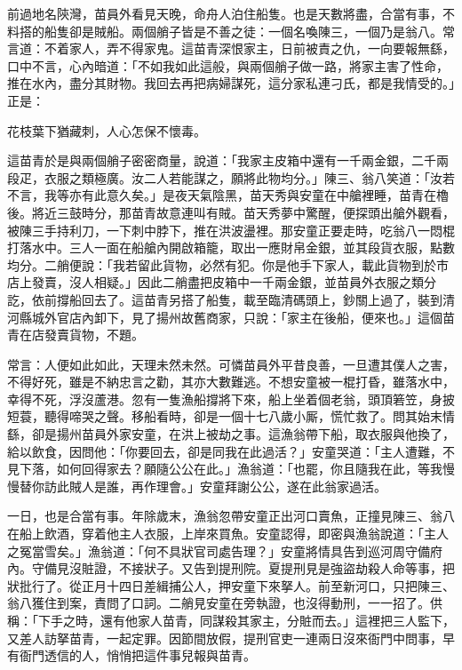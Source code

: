前過地名陝灣，苗員外看見天晚，命舟人泊住船隻。也是天數將盡，合當有事，不料搭的船隻卻是賊船。兩個艄子皆是不善之徒：一個名喚陳三，一個乃是翁八。常言道：不着家人，弄不得家鬼。這苗青深恨家主，日前被責之仇，一向要報無繇，口中不言，心內暗道：「不如我如此這般，與兩個艄子做一路，將家主害了性命，推在水內，盡分其財物。我回去再把病婦謀死，這分家私連刁氏，都是我情受的。」正是：

\begin{myquote}
花枝葉下猶藏刺，人心怎保不懷毒。
\end{myquote}

這苗青於是與兩個艄子密密商量，說道：「我家主皮箱中還有一千兩金銀，二千兩段疋，衣服之類極廣。汝二人若能謀之，願將此物均分。」陳三、翁八笑道：「汝若不言，我等亦有此意久矣。」是夜天氣陰黑，苗天秀與安童在中艙裡睡，苗青在櫓後。將近三鼓時分，那苗青故意連叫有賊。苗天秀夢中驚醒，便探頭出艙外觀看，被陳三手持利刀，一下刺中脖下，推在洪波盪裡。那安童正要走時，吃翁八一悶棍打落水中。三人一面在船艙內開啟箱籠，取出一應財帛金銀，並其段貨衣服，點數均分。二艄便說：「我若留此貨物，必然有犯。你是他手下家人，載此貨物到於市店上發賣，沒人相疑。」因此二艄盡把皮箱中一千兩金銀，並苗員外衣服之類分訖，依前撐船回去了。這苗青另搭了船隻，載至臨清碼頭上，鈔關上過了，裝到清河縣城外官店內卸下，見了揚州故舊商家，只說：「家主在後船，便來也。」這個苗青在店發賣貨物，不題。

常言：人便如此如此，天理未然未然。可憐苗員外平昔良善，一旦遭其僕人之害，不得好死，雖是不納忠言之勸，其亦大數難逃。不想安童被一棍打昏，雖落水中，幸得不死，浮沒蘆港。忽有一隻漁船撐將下來，船上坐着個老翁，頭頂箬笠，身披短蓑，聽得啼哭之聲。移船看時，卻是一個十七八歲小厮，慌忙救了。問其始末情繇，卻是揚州苗員外家安童，在洪上被劫之事。這漁翁帶下船，取衣服與他換了，給以飲食，因問他：「你要回去，卻是同我在此過活？」安童哭道：「主人遭難，不見下落，如何回得家去？願隨公公在此。」漁翁道：「也罷，你且隨我在此，等我慢慢替你訪此賊人是誰，再作理會。」安童拜謝公公，遂在此翁家過活。

一日，也是合當有事。年除歲末，漁翁忽帶安童正出河口賣魚，正撞見陳三、翁八在船上飲酒，穿着他主人衣服，上岸來買魚。安童認得，即密與漁翁說道：「主人之冤當雪矣。」漁翁道：「何不具狀官司處告理？」安童將情具告到巡河周守備府內。守備見沒賍證，不接狀子。又告到提刑院。夏提刑見是強盜劫殺人命等事，把狀批行了。從正月十四日差緝捕公人，押安童下來拏人。前至新河口，只把陳三、翁八獲住到案，責問了口詞。二艄見安童在旁執證，也沒得動刑，一一招了。供稱：「下手之時，還有他家人苗青，同謀殺其家主，分賍而去。」這裡把三人監下，又差人訪拏苗青，一起定罪。因節間放假，提刑官吏一連兩日沒來衙門中問事，早有衙門透信的人，悄悄把這件事兒報與苗青。

